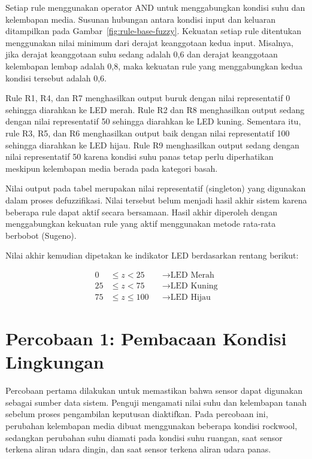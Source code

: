 \documentclass[12pt,a4paper]{article}
\begin{document}
Setiap rule menggunakan operator AND untuk menggabungkan kondisi suhu dan kelembapan media. Susunan hubungan antara kondisi input dan keluaran ditampilkan pada Gambar~\ref{fig:rule-base-fuzzy}. Kekuatan setiap rule ditentukan menggunakan nilai minimum dari derajat keanggotaan kedua input. Misalnya, jika derajat keanggotaan suhu sedang adalah 0,6 dan derajat keanggotaan kelembapan lembap adalah 0,8, maka kekuatan rule yang menggabungkan kedua kondisi tersebut adalah 0,6.

Rule R1, R4, dan R7 menghasilkan output buruk dengan nilai representatif 0 sehingga diarahkan ke LED merah. Rule R2 dan R8 menghasilkan output sedang dengan nilai representatif 50 sehingga diarahkan ke LED kuning. Sementara itu, rule R3, R5, dan R6 menghasilkan output baik dengan nilai representatif 100 sehingga diarahkan ke LED hijau. Rule R9 menghasilkan output sedang dengan nilai representatif 50 karena kondisi suhu panas tetap perlu diperhatikan meskipun kelembapan media berada pada kategori basah.

Nilai output pada tabel merupakan nilai representatif (singleton) yang digunakan dalam proses defuzzifikasi. Nilai tersebut belum menjadi hasil akhir sistem karena beberapa rule dapat aktif secara bersamaan. Hasil akhir diperoleh dengan menggabungkan kekuatan rule yang aktif menggunakan metode rata-rata berbobot (Sugeno).

\clearpage

Nilai akhir kemudian dipetakan ke indikator LED berdasarkan rentang berikut:

\[
\begin{aligned}
0 &\leq z < 25 &&\rightarrow \text{LED Merah} \\
25 &\leq z < 75 &&\rightarrow \text{LED Kuning} \\
75 &\leq z \leq 100 &&\rightarrow \text{LED Hijau}
\end{aligned}
\]

\section{Percobaan 1: Pembacaan Kondisi Lingkungan}

Percobaan pertama dilakukan untuk memastikan bahwa sensor dapat digunakan sebagai sumber data sistem. Penguji mengamati nilai suhu dan kelembapan tanah sebelum proses pengambilan keputusan diaktifkan. Pada percobaan ini, perubahan kelembapan media dibuat menggunakan beberapa kondisi rockwool, sedangkan perubahan suhu diamati pada kondisi suhu ruangan, saat sensor terkena aliran udara dingin, dan saat sensor terkena aliran udara panas.
\end{document}
